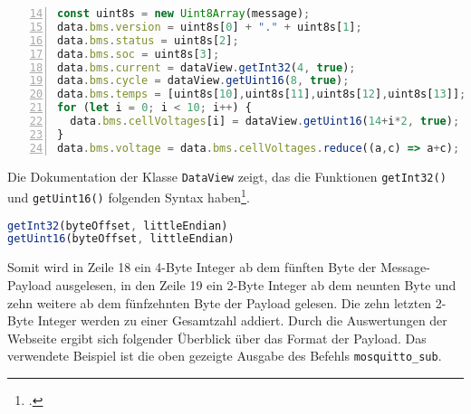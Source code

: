 \begin{lstlisting}[language=JavaScript,numbers=left,xleftmargin=2.5em,framexleftmargin=2em,firstnumber=14,label={lst:bms-reverse}]
const uint8s = new Uint8Array(message);
data.bms.version = uint8s[0] + "." + uint8s[1];
data.bms.status = uint8s[2];
data.bms.soc = uint8s[3];
data.bms.current = dataView.getInt32(4, true);
data.bms.cycle = dataView.getUint16(8, true);
data.bms.temps = [uint8s[10],uint8s[11],uint8s[12],uint8s[13]];
for (let i = 0; i < 10; i++) {
  data.bms.cellVoltages[i] = dataView.getUint16(14+i*2, true);
}
data.bms.voltage = data.bms.cellVoltages.reduce((a,c) => a+c);
\end{lstlisting}

\noindent Die Dokumentation der Klasse \texttt{DataView} zeigt, das die Funktionen \texttt{getInt32()} und \texttt{getUint16()}
folgenden Syntax haben\footcite{dataview}.

\begin{lstlisting}[language=JavaScript]
getInt32(byteOffset, littleEndian)
getUint16(byteOffset, littleEndian)
\end{lstlisting}

Somit wird in Zeile \num{18} ein \num{4}-Byte Integer ab dem fünften Byte der Message-Payload ausgelesen, in den Zeile
\num{19} ein \num{2}-Byte Integer ab dem neunten Byte und zehn weitere ab dem fünfzehnten Byte der Payload gelesen.
Die zehn letzten \num{2}-Byte Integer werden zu einer Gesamtzahl addiert.
Durch die Auswertungen der Webseite ergibt sich folgender Überblick über das Format der Payload.
Das verwendete Beispiel ist die oben gezeigte Ausgabe des Befehls \texttt{mosquitto\_\allowbreak sub}.

